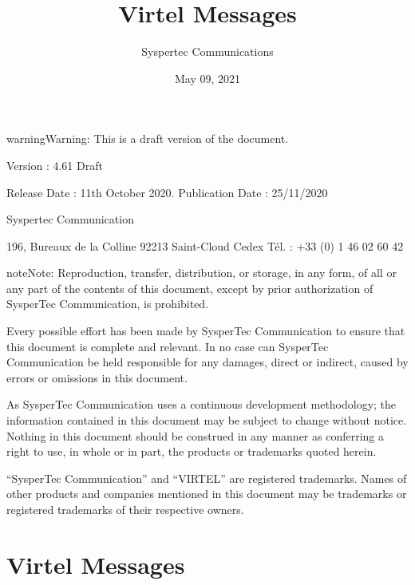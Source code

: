 \documentclass[letterpaper,10pt,english]{sphinxmanual}
\title{Virtel Messages}
\date{May 09, 2021}
\author{Syspertec Communications}
\begin{document}
\pagestyle{empty}
\sphinxmaketitle
\pagestyle{plain}
\sphinxtableofcontents
\pagestyle{normal}
\label{\detokenize{messages::doc}}




\begin{sphinxadmonition}{warning}{Warning:}
This is a draft version of the document.
\end{sphinxadmonition}

Version : 4.61 Draft

Release Date : 11th October 2020. Publication Date : 25/11/2020

Syspertec Communication

196, Bureaux de la Colline 92213 Saint-Cloud Cedex Tél. : +33 (0) 1 46 02 60 42


\begin{sphinxadmonition}{note}{Note:}
Reproduction, transfer, distribution, or storage, in any form, of all or any part of
the contents of this document, except by prior authorization of SysperTec
Communication, is prohibited.

Every possible effort has been made by SysperTec Communication to ensure that this document
is complete and relevant. In no case can SysperTec Communication be held responsible for
any damages, direct or indirect, caused by errors or omissions in this document.

As SysperTec Communication uses a continuous development methodology; the information
contained in this document may be subject to change without notice. Nothing in this
document should be construed in any manner as conferring a right to use, in whole or in
part, the products or trademarks quoted herein.

“SysperTec Communication” and “VIRTEL” are registered trademarks. Names of other products
and companies mentioned in this document may be trademarks or registered trademarks of
their respective owners.
\end{sphinxadmonition}


\chapter{Virtel Messages}
\label{\detokenize{messages:virtel-messages}}\label{\detokenize{messages:v460mg-introduction}}
\end{document}
